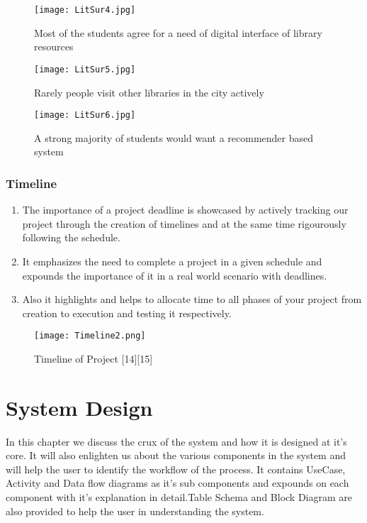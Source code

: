 \documentclass[a4paper,12pt]{report}
\begin{document}
   \begin{figure}[h!]
    \centering
    \texttt{[image: LitSur4.jpg]}
    \caption{Most of the students agree for a need of digital interface of library resources }
  \end{figure}

  \pagebreak
    \begin{figure}[h!]
    \centering
    \texttt{[image: LitSur5.jpg]}
    \caption{Rarely people visit other libraries in the city actively}
  \end{figure}

  \begin{figure}[h!]
    \centering
    \texttt{[image: LitSur6.jpg]}
    \caption{A strong majority of students would want a recommender based system}
  \end{figure}
  
  \subsection{Timeline}
    \begin{enumerate}
      \item The importance of a project deadline is showcased by actively tracking our project through the creation of          timelines and at the same time rigourously following the schedule.
      \item It emphasizes the need to complete a project in a given schedule and expounds the importance of it in a real world scenario with deadlines.
      \item Also it highlights and helps to allocate time to all phases of your project from creation to execution and testing it respectively.
    \end{enumerate}
    \begin{figure}[h!]
    \centering
    \texttt{[image: Timeline2.png]}
    \caption{Timeline of Project [14][15]}
  \end{figure}


\chapter{System Design}


\par In this chapter we discuss the crux of the system and how it is designed at it's core. It will also enlighten us about the various components in the system and will help the user to identify the workflow of the process. It contains UseCase, Activity and Data flow diagrams as it's sub components and expounds on each component with it's explanation in detail.Table Schema and Block Diagram are also provided to help the user in understanding the system.\\
\end{document}
